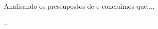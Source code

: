 \documentclass[	DIV=calc,%
							paper=a4,%
							fontsize=12pt,%
							onecolumn]{scrartcl}	 					%
\begin{document}
Analisando os pressupostos de \cite{ref3} e \cite{ref4} concluimos que....


\renewcommand\refname{} %

  

..
\end{document}
